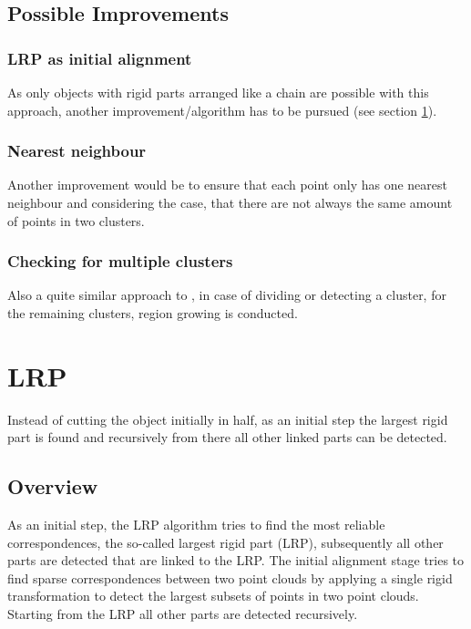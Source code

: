 \documentclass[notitlepage,english]{hgbreport}
\begin{document}
\subsection{Possible Improvements}

\subsubsection{LRP as initial alignment}

As only objects with rigid parts arranged like a chain are possible with this approach, another improvement/algorithm has to be pursued (see section \ref{sec:LRP}).

\subsubsection{Nearest neighbour}

Another improvement would be to ensure that each point only has one nearest neighbour and considering the case, that there are not always the same amount of points in two clusters. 

\subsubsection{Checking for multiple clusters}

Also a quite similar approach to \cite{guo2016correspondence}, in case of dividing or detecting a cluster, for the remaining clusters, region growing is conducted. 

\section{LRP}
\label{sec:LRP}

Instead of cutting the object initially in half, as an initial step the largest rigid part is found and recursively from there all other linked parts can be detected.

\subsection{Overview}
As an initial step, the LRP algorithm tries to find the most reliable correspondences, the so-called largest rigid part (LRP), subsequently all other parts are detected that are linked to the LRP. The initial alignment stage tries to find sparse correspondences between two point clouds by applying a single rigid transformation to detect the largest subsets of points in two point clouds. Starting from the LRP all other parts are detected recursively.
\end{document}
